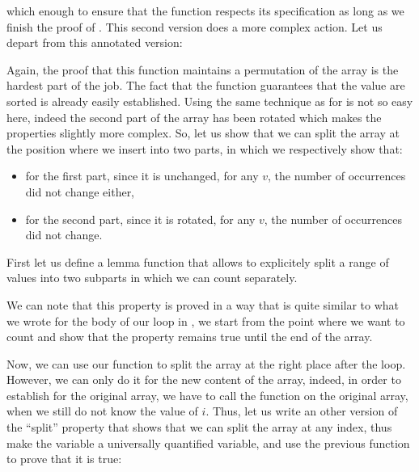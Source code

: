 

which enough to ensure that the  function respects
its specification as long as we finish the proof of . This
second version does a more complex action. Let us depart from this annotated
version:




Again, the proof that this function maintains a permutation of the array is
the hardest part of the job. The fact that the function guarantees that the
value are sorted is already easily established. Using the same technique as
for  is not so easy here, indeed the second part
of the array has been rotated which makes the properties slightly more
complex. So, let us show that we can split the array at the position where
we insert into two parts, in which we respectively show that:

\begin{itemize}
\item for the first part, since it is unchanged, for any $v$, the number of
  occurrences did not change either,
\item for the second part, since it is rotated, for any $v$, the number of
  occurrences did not change.
\end{itemize}

First let us define a lemma function that allows to explicitely split a
range of values into two subparts in which we can count separately.




We can note that this property is proved in a way that is quite similar to
what we wrote for the body of our loop in , we
start from the point where we want to count and show that the property
remains true until the end of the array. 



Now, we can use our function to split the array at the right place after
the loop. However, we can only do it for the new content of the array,
indeed, in order to establish for the original array, we have to call the
function on the original array, when we still do not know the value of $i$.
Thus, let us write an other version of the ``split'' property that shows
that we can split the array at any index, thus make the 
variable a universally quantified variable, and use the previous function
to prove that it is true:


